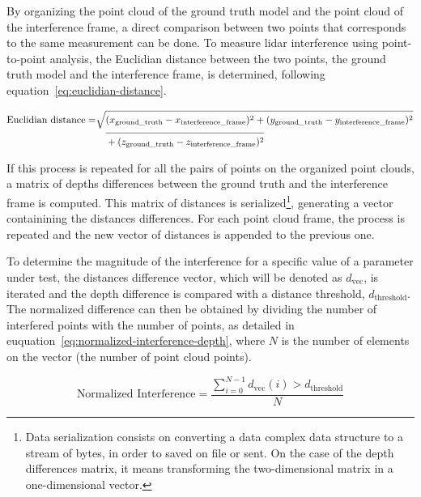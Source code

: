 By organizing the point cloud of the ground truth model and the point cloud of the interference frame, a direct comparison between two points that corresponds to the same measurement can be done. To measure \ac{lidar} interference using point-to-point analysis, the Euclidian distance between the two points, the ground truth model and the interference frame, is determined, following equation~\ref{eq:euclidian-distance}.

\begin{equation}
	\label{eq:euclidian-distance}
	\begin{split}
	\displaystyle
	\text{Euclidian distance} = & \sqrt{(x_{\text{ground\_truth}} - x_{\text{interference\_frame}})^2 + (y_{\text{ground\_truth}} - y_{\text{interference\_frame}})^2} \\
															& \displaystyle \quad \overline{\rule{0pt}{2.5ex} + (z_{\text{ground\_truth}} - z_{\text{interference\_frame}})^2 }
	\end{split}
\end{equation}

If this process is repeated for all the pairs of points on the organized point clouds, a matrix of depths differences between the ground truth and the interference frame is computed. This matrix of distances is serialized\footnote{Data serialization consists on converting a data complex data structure to a stream of bytes, in order to saved on file or sent. On the case of the depth differences matrix, it means transforming the two-dimensional matrix in a one-dimensional vector.}, generating a vector containining the distances differences. For each point cloud frame, the process is repeated and the new vector of distances is appended to the previous one. 

To determine the magnitude of the interference for a specific value of a parameter under test, the distances difference vector, which will be denoted as $d_\text{vec}$, is iterated and the depth difference is compared with a distance threshold, $d_\text{threshold}$. The normalized difference can then be obtained by dividing the number of interfered points with the number of points, as detailed in euquation~\ref{eq:normalized-interference-depth}, where $N$ is the number of elements on the vector (the number of point cloud points).

\begin{equation}
	\label{eq:normalized-interference-depth}
	\displaystyle
	\text{Normalized Interference} = \frac{\sum\limits^{N-1}_{i = 0} d_{\text{vec}}(i)
	> d_\text{threshold}}{N}
\end{equation}

